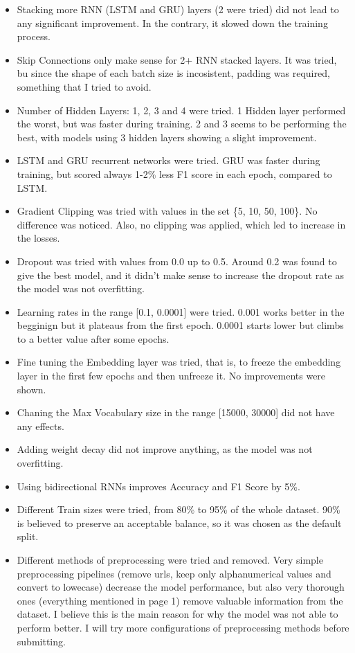 \documentclass[12pt]{report}
\begin{document}
\begin{itemize}
    \item Stacking more RNN (LSTM and GRU) layers (2 were tried) did not lead to any
        significant improvement. In the contrary, it slowed down the training process.
    \item Skip Connections only make sense for 2+ RNN stacked layers. It was tried, bu since
        the shape of each batch size is incosistent, padding was required, something that I
        tried to avoid.
    \item Number of Hidden Layers: 1, 2, 3 and 4 were tried. 1 Hidden layer performed the
        worst, but was faster during training. 2 and 3 seems to be performing the best, with
        models using 3 hidden layers showing a slight improvement.
    \item LSTM and GRU recurrent networks were tried. GRU was faster during training, but
        scored always 1-2\% less F1 score in each epoch, compared to LSTM.
    \item Gradient Clipping was tried with values in the set \{5, 10, 50, 100\}. No
        difference was noticed. Also, no clipping was applied, which led to increase in
        the losses.
    \item Dropout was tried with values from 0.0 up to 0.5. Around 0.2 was found to give
        the best model, and it didn't make sense to increase the dropout rate as the model
        was not overfitting.
    \item Learning rates in the range [0.1, 0.0001] were tried. 0.001 works better in the
        begginign but it plateaus from the first epoch. 0.0001 starts lower but climbs to
        a better value after some epochs.
    \item Fine tuning the Embedding layer was tried, that is, to freeze the embedding layer
        in the first few epochs and then unfreeze it. No improvements were shown.
    \item Chaning the Max Vocabulary size in the range [15000, 30000] did not have any effects.
    \item Adding weight decay did not improve anything, as the model was not overfitting.
    \item Using bidirectional RNNs improves Accuracy and F1 Score by 5\%.
    \item Different Train sizes were tried, from 80\% to 95\% of the whole dataset. 90\% is
        believed to preserve an acceptable balance, so it was chosen as the default split.
    \item Different methods of preprocessing were tried and removed. Very simple preprocessing
        pipelines (remove urls, keep only alphanumerical values and convert to lowecase) decrease
        the model performance, but also very thorough ones (everything mentioned in page 1) remove
        valuable information from the dataset. I believe this is the main reason for why the
        model was not able to perform better. I will try more configurations of preprocessing
        methods before submitting.
\end{itemize}
\bigskip
\end{document}
